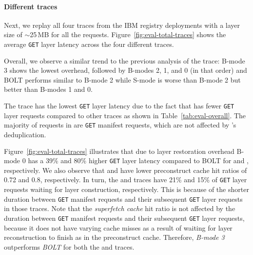 \paragraph{Different traces} Next, we replay all four traces from the IBM registry deployments
with a layer size of $\sim$25\,MB for all the requests.
%
%
Figure~\ref{fig:eval-total-traces} shows the average \texttt{GET} layer latency across the four different traces.


Overall, we observe a similar trend to the previous analysis of the
\dal trace: B-mode 3 shows the lowest overhead, followed by
B-modes 2, 1, and 0 (in that order) and BOLT performs similar to B-mode 2
while S-mode is worse than B-mode 2 but better than B-modes 1 and 0.

The \lon trace has the lowest \texttt{GET} layer latency due to the fact that
\lon has fewer \texttt{GET} layer requests compared to other traces as shown in Table~\ref{tab:eval-overall}. 
%
The majority of requests in \lon are \texttt{GET} manifest requests, which are not affected
by \sysname{}'s deduplication.
%

Figure~\ref{fig:eval-total-traces} illustrates that due to layer restoration overhead
B-mode 0 has a 39\% and 80\% higher \texttt{GET} layer latency
compared to BOLT for \fra and \lon, respectively.
%
We also observe that \fra and \lon have lower preconstruct
cache hit ratios of 0.72 and 0.8, respectively.
%
In turn, the \fra and \lon traces have 21\% and 15\% of \texttt{GET} layer
requests waiting for layer construction, respectively.
%
%
This is because of the shorter duration between \texttt{GET} manifest requests and
their subsequent \texttt{GET} layer requests in those traces.
%
Note that the \emph{superfetch cache} hit ratio is not affected by the duration 
between \texttt{GET} manifest requests and their subsequent \texttt{GET} layer 
requests, because it does not have varying cache misses as a result of waiting 
for layer reconstruction to finish as in the preconstruct cache.
%
%
Therefore, \emph{B-mode 3} outperforms \emph{BOLT} for both the \fra and \lon traces.
%
%
%


